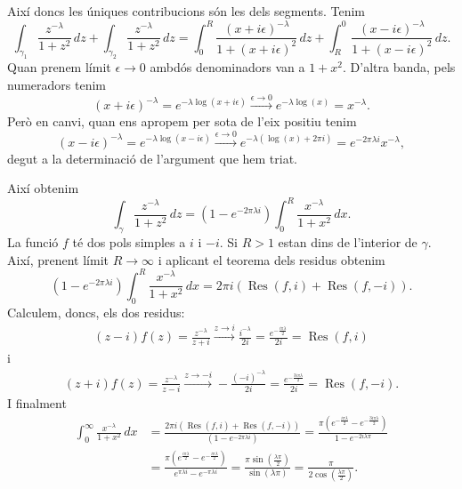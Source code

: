 \documentclass[12pt]{article}
\numberwithin{table}{section}
\numberwithin{figure}{section}
\numberwithin{equation}{section}
\DeclareMathOperator{\Res}{Res}
\begin{document}
Així doncs les úniques contribucions són les dels segments. Tenim
\begin{equation*}
	\int_{\gamma_1} \frac{z^{-\lambda}}{1 + z^2} \, dz + \int_{\gamma_2} \frac{z^{-\lambda}}{1 + z^2} \, dz  = \int_0^R \frac{(x + i\epsilon)^{-\lambda}}{1 + (x + i\epsilon)^2} \, dz + \int_R^0 \frac{(x - i\epsilon)^{-\lambda}}{1 + (x - i\epsilon)^2} \, dz.
\end{equation*}
Quan prenem límit \( \epsilon \to 0 \) ambdós denominadors van a \( 1 + x^2 \). D'altra banda, pels numeradors tenim
\begin{equation*}
	(x + i\epsilon)^{-\lambda} = e^{-\lambda \log(x + i\epsilon)} \xrightarrow{\epsilon \to 0} e^{-\lambda \log(x)} = x^{-\lambda}.
\end{equation*}
Però en canvi, quan ens apropem per sota de l'eix positiu tenim
\begin{equation*}
	(x - i\epsilon)^{-\lambda} = e^{-\lambda \log(x - i\epsilon)} \xrightarrow{\epsilon \to 0} e^{-\lambda (\log(x) + 2\pi i)} = e^{-2\pi \lambda i}x^{-\lambda},
\end{equation*}
degut a la determinació de l'argument que hem triat.

Així obtenim
\begin{equation*}
	\int_\gamma \frac{z^{-\lambda}}{1 + z^2} \, dz = (1 - e^{-2\pi\lambda i}) \int_0^R \frac{x^{-\lambda}}{1 + x^2} \, dx.
\end{equation*}
La funció \( f \) té dos pols simples a \( i \) i \( -i \). Si \( R > 1 \) estan dins de l'interior de \( \gamma \). Així, prenent límit \( R \to \infty \) i aplicant el teorema dels residus obtenim
\begin{equation*}
	(1 - e^{-2\pi\lambda i}) \int_0^R \frac{x^{-\lambda}}{1 + x^2} \, dx = 2\pi i (\Res(f,i) + \Res(f,-i)).
\end{equation*}
Calculem, doncs, els dos residus:
\begin{align*}
	(z - i)f(z) = \frac{z^{-\lambda}}{z + i} \xrightarrow{z \to i} \frac{i^{-\lambda}}{2i} = \frac{e^{-\frac{i\pi\lambda}{2}}}{2i} = \Res(f,i)
\end{align*}
i
\begin{align*}
	(z + i)f(z) = \frac{z^{-\lambda}}{z - i} \xrightarrow{z \to -i} -\frac{(-i)^{-\lambda}}{2i} = \frac{e^{-\frac{3i\pi\lambda}{2}}}{2i} = \Res(f,-i).
\end{align*}
I finalment
\begin{align*}
	\int_0^\infty \frac{x^{-\lambda}}{1 + x^2} \, dx & = \frac{2\pi i(\Res(f,i) + \Res(f,-i))}{(1 - e^{-2\pi\lambda i})} = \frac{\pi(e^{-\frac{i\pi\lambda}{2}} - e^{-\frac{3i\pi\lambda}{2}})}{1 - e^{-2i\lambda\pi}} \\
																									 & = \frac{\pi(e^{\frac{i\pi\lambda}{2}} - e^{-\frac{i\pi\lambda}{2}})}{e^{\pi\lambda i} - e^{-\pi\lambda i}} = \frac{\pi\sin\left(\frac{\lambda\pi}{2}\right)}{\sin(\lambda \pi)} = \frac{\pi}{2\cos\left(\frac{\lambda\pi}{2}\right)}.
\end{align*}
\end{document}
